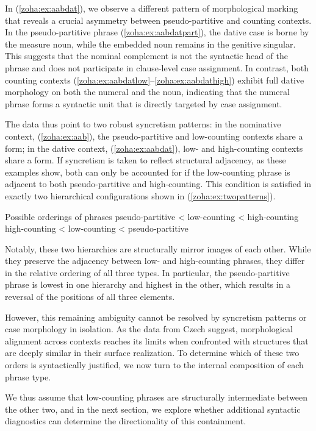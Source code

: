 \documentclass[output=paper,colorlinks,citecolor=brown
]{langscibook}
\begin{document}
\noindent In (\ref{zoha:ex:aabdat}), we observe a different pattern of morphological marking that reveals a crucial asymmetry between pseudo-partitive and counting contexts. In the pseudo-partitive phrase (\ref{zoha:ex:aabdatpart}), the dative case is borne by the measure noun, while the embedded noun remains in the genitive singular. This suggests that the nominal complement is not the syntactic head of the phrase and does not participate in clause-level case assignment. In contrast, both counting contexts (\ref{zoha:ex:aabdatlow}--\ref{zoha:ex:aabdathigh}) exhibit full dative morphology on both the numeral and the noun, indicating that the numeral phrase forms a syntactic unit that is directly targeted by case assignment.

The data thus point to two robust syncretism patterns: in the nominative context, (\ref{zoha:ex:aab}), the pseudo-partitive and low-counting contexts share a form; in the dative context, (\ref{zoha:ex:aabdat}), low- and high-counting contexts share a form. If syncretism is taken to reflect structural adjacency, as these examples show, both can only be accounted for if the low-counting phrase is adjacent to both pseudo-partitive and high-counting. This condition is satisfied in exactly two hierarchical configurations shown in (\ref{zoha:ex:twopatterns}).

\ea Possible orderings of phrases \label{zoha:ex:twopatterns}
    \ea pseudo-partitive < low-counting < high-counting
    \ex  high-counting < low-counting < pseudo-partitive
    \z
\z

\noindent Notably, these two hierarchies are structurally mirror images of each other. While they preserve the adjacency between low- and high-counting phrases, they differ in the relative ordering of all three types. In particular, the pseudo-partitive phrase is lowest in one hierarchy and highest in the other, which results in a reversal of the positions of all three elements.

However, this remaining ambiguity cannot be resolved by syncretism patterns or case morphology in isolation. As the data from Czech suggest, morphological alignment across contexts reaches its limits when confronted with structures that are deeply similar in their surface realization. To determine which of these two orders is syntactically justified, we now turn to the internal composition of each phrase type.

We thus assume that low-counting phrases are structurally intermediate between the other two, and in the next section, we explore whether additional syntactic diagnostics can determine the directionality of this containment.
\end{document}
